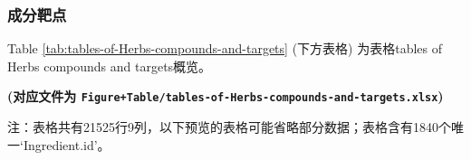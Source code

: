 \documentclass[
]{article}
\begin{document}
\hypertarget{ux6210ux5206ux9776ux70b9}{%
\subsubsection{成分靶点}\label{ux6210ux5206ux9776ux70b9}}

Table \ref{tab:tables-of-Herbs-compounds-and-targets} (下方表格) 为表格tables of Herbs compounds and targets概览。

\textbf{(对应文件为 \texttt{Figure+Table/tables-of-Herbs-compounds-and-targets.xlsx})}

\begin{center}\begin{tcolorbox}[colback=gray!10, colframe=gray!50, width=0.9\linewidth, arc=1mm, boxrule=0.5pt]注：表格共有21525行9列，以下预览的表格可能省略部分数据；表格含有1840个唯一`Ingredient.id'。
\end{tcolorbox}
\end{center}
\end{document}
